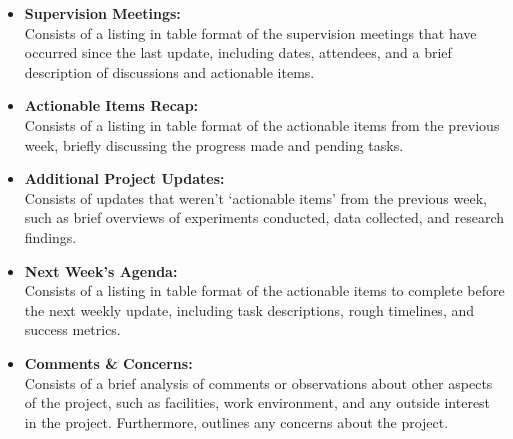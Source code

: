 \begin{itemize}
    \item \textbf{Supervision Meetings:}\\Consists of a listing in table format of the supervision meetings that have occurred since the last update, including dates, attendees, and a brief description of discussions and actionable items.
    \item \textbf{Actionable Items Recap:}\\Consists of a listing in table format of the actionable items from the previous week, briefly discussing the progress made and pending tasks.
    \item \textbf{Additional Project Updates:}\\Consists of updates that weren't `actionable items' from the previous week, such as brief overviews of experiments conducted, data collected, and research findings.
    \item \textbf{Next Week's Agenda:}\\Consists of a listing in table format of the actionable items to complete before the next weekly update, including task descriptions, rough timelines, and success metrics.
    \item \textbf{Comments \& Concerns:}\\Consists of a brief analysis of comments or observations about other aspects of the project, such as facilities, work environment, and any outside interest in the project. Furthermore, outlines any concerns about the project.
\end{itemize}